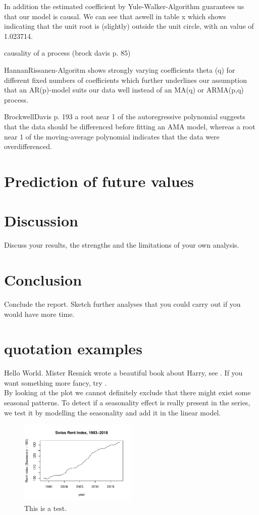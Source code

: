 \documentclass[11pt,a4paper]{article}
\begin{document}
In addition the estimated coefficient by Yule-Walker-Algorithm guarantees us that our model is causal. We can see that aswell in table x which shows indicating that the unit root is (slightly) outside the unit circle, with an value of 1.023714.

causality of a process (brock davis p. 85)

HannanRissanen-Algoritm shows strongly varying coefficients theta (q) for different fixed numbers of coefficients
which further underlines our assumption that an AR(p)-model suits our data well instead of an MA(q) or ARMA(p,q) process.


BrockwellDavis p. 193 a root near 1 of the autoregressive polynomial suggests that the data should be differenced before fitting an AMA model, whereas a root near 1 of the moving-average polynomial indicates that the data were overdifferenced. 

\section{Prediction of future values}

\section{Discussion}
Discuss your results, the strengths and the limitations of your own analysis. 

\section{Conclusion}
Conclude the report. Sketch further analyses that you could carry out if you would have more time.


\section{quotation examples}
Hello World. Mister Resnick wrote a beautiful book about Harry, see \citep{Resnick92}. If you want something more fancy, try \citet{Baddeley07}.
\\By looking at the plot we cannot definitely exclude that there might exist some seasonal patterns. To detect if a seasonality effect is really present in the series, we test it by modelling the seasonality and add it in the linear model. 


\begin{figure}
\centering
\includegraphics[angle=0,
width=0.5\textwidth]{indiceloyers_timeseries}
\caption{This is a test.}
\end{figure}


\end{document}
